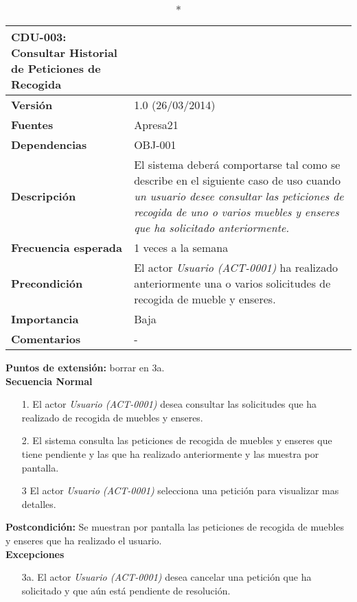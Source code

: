 \begin{longtable}{p{2.5cm}  p{14cm}}
\caption*{\textbf{CDU-003: Consultar Historial de Peticiones de Recogida}} \\
\hline
\textbf{Versión} & 1.0 (26/03/2014) \\
\textbf{Fuentes} & Apresa21 \\
\textbf{Dependencias} & OBJ-001 \\
\textbf{Descripción} & El sistema deberá comportarse tal como se describe en el siguiente caso de uso cuando \textit{un usuario desee consultar las peticiones de recogida de uno o varios muebles y enseres que ha solicitado anteriormente.} \\
\textbf{Frecuencia esperada} & 1 veces a la semana  \\
\textbf{Precondición} & El actor \textit{Usuario (ACT-0001)} ha realizado anteriormente una o varios solicitudes de recogida de mueble y enseres. \\
\textbf{Importancia} & Baja  \\
\textbf{Comentarios} &- \\
\end{longtable}

\textbf{Puntos de extensión:} 
borrar en 3a. \\

\textbf{Secuencia Normal} 
\begin{enumerate}
	\item[1.] El actor \textit{Usuario (ACT-0001)} desea consultar las solicitudes que ha realizado de recogida de muebles y enseres.
	\item[2.] El sistema consulta las peticiones de recogida de muebles y enseres que tiene pendiente y las que ha realizado anteriormente y las muestra por pantalla.
	\item[3] El actor \textit{Usuario (ACT-0001)} selecciona una petición para visualizar mas detalles.
\end{enumerate}

\textbf{Postcondición: } 
 Se muestran por pantalla las peticiones de recogida de muebles y enseres que ha realizado el usuario.\\

\textbf{Excepciones} 
\begin{enumerate}
	\item[3a.] El actor \textit{Usuario (ACT-0001)} desea cancelar una petición que ha solicitado y que aún está pendiente de resolución.
\end{enumerate} 